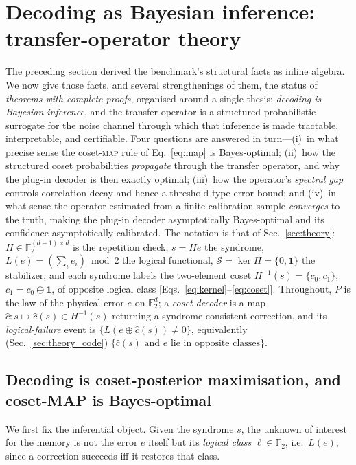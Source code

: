 \documentclass[reprint,aps,prxquantum,amsmath,amssymb,floatfix,nofootinbib,longbibliography]{revtex4-2}
\theoremstyle{definition}
\theoremstyle{remark}
\theoremstyle{plain}
\newcommand{\F}{\mathbb{F}}
\newcommand{\calS}{\mathcal{S}}
\newcommand{\bone}{\mathbf 1}
\begin{document}
\section{Decoding as Bayesian inference: transfer-operator theory}
\label{sec:bayes}

The preceding section derived the benchmark's structural facts as inline
algebra. We now give those facts, and several strengthenings of them, the
status of \emph{theorems with complete proofs}, organised around a single
thesis: \emph{decoding is Bayesian inference}, and the transfer operator is a
structured probabilistic surrogate for the noise channel through which that
inference is made tractable, interpretable, and certifiable. Four questions are
answered in turn---(i)~in what precise sense the coset-\textsc{map} rule of
Eq.~\eqref{eq:map} is Bayes-optimal; (ii)~how the structured coset
probabilities \emph{propagate} through the transfer operator, and why the
plug-in decoder is then exactly optimal; (iii)~how the operator's
\emph{spectral gap} controls correlation decay and hence a threshold-type
error bound; and (iv)~in what sense the operator estimated from a finite
calibration sample \emph{converges} to the truth, making the plug-in decoder
asymptotically Bayes-optimal and its confidence asymptotically calibrated. The
notation is that of Sec.~\ref{sec:theory}: $H\in\F_2^{(d-1)\times d}$ is the
repetition check, $s=He$ the syndrome, $L(e)=(\sum_i e_i)\bmod2$ the logical
functional, $\calS=\ker H=\{0,\bone\}$ the stabilizer, and each syndrome labels
the two-element coset $H^{-1}(s)=\{c_0,c_1\}$, $c_1=c_0\oplus\bone$, of opposite
logical class [Eqs.~\eqref{eq:kernel}--\eqref{eq:coset}]. Throughout, $P$ is the
law of the physical error $e$ on $\F_2^d$; a \emph{coset decoder} is a map
$\hat c\colon s\mapsto\hat c(s)\in H^{-1}(s)$ returning a syndrome-consistent
correction, and its \emph{logical-failure} event is
$\{L(e\oplus\hat c(s))\neq0\}$, equivalently (Sec.~\ref{sec:theory_code})
$\{\hat c(s)\text{ and }e\text{ lie in opposite classes}\}$.

\subsection{Decoding is coset-posterior maximisation, and coset-MAP is Bayes-optimal}
\label{sec:bayes_map}

We first fix the inferential object. Given the syndrome $s$, the unknown of
interest for the memory is not the error $e$ itself but its \emph{logical
class} $\ell\in\F_2$, i.e.\ $L(e)$, since a correction succeeds iff it restores
that class.
\end{document}
